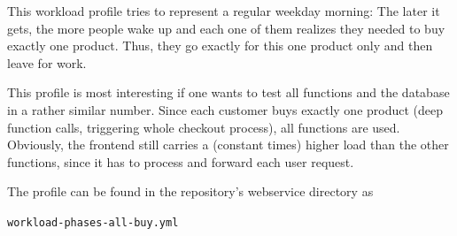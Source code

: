\documentclass[../main.tex]{subfiles}
\begin{document}
This workload profile tries to represent a regular weekday morning: 
The later it gets, the more people wake up and each one of them realizes they needed to buy exactly one product.
Thus, they go exactly for this one product only and then leave for work.

This profile is most interesting if one wants to test all functions and the database in a rather similar number.
Since each customer buys exactly one product (deep function calls, triggering whole checkout process),
all functions are used. 
Obviously, the frontend still carries a (constant times) higher load than the other functions, 
since it has to process and forward each user request.

The profile can be found in the repository's webservice directory as 
\begin{tcolorbox}
\quad\texttt{workload-phases-all-buy.yml}
\end{tcolorbox}
\end{document}
